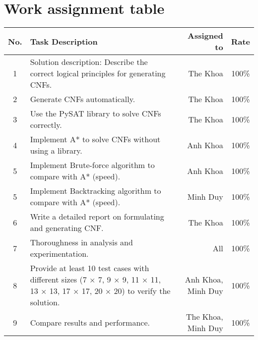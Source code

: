 \section{Work assignment table}
\begin{center}
  \renewcommand{\arraystretch}{1.5}
  \begin{tabular}{|c|p{}|r|c|}
    \hline
    \textbf{No.} & \textbf{Task Description}                                                                                                      & \textbf{Assigned to} & \textbf{Rate} \\\hline
    1            & Solution description: Describe the correct logical principles for generating CNFs.                                             & The Khoa             & 100\%         \\\hline
    2            & Generate CNFs automatically.                                                                                                   & The Khoa             & 100\%         \\\hline
    3            & Use the PySAT library to solve CNFs correctly.                                                                                 & The Khoa             & 100\%         \\\hline
    4            & Implement A* to solve CNFs without using a library.                                                                            & Anh Khoa             & 100\%         \\\hline
    5            & Implement Brute-force algorithm to compare with A* (speed).                                                                    & Anh Khoa             & 100\%         \\\hline
    5            & Implement Backtracking algorithm to compare with A* (speed).                                                                   & Minh Duy             & 100\%         \\\hline
    6            & Write a detailed report on formulating and generating CNF\@.                                                                   & The Khoa             & 100\%         \\\hline
    7            & Thoroughness in analysis and experimentation.                                                                                  & All                  & 100\%         \\\hline
    8            & Provide at least 10 test cases with different sizes (7 × 7, 9 × 9, 11 × 11, 13 × 13, 17 × 17, 20 × 20) to verify the solution. & Anh Khoa, Minh Duy   & 100\%         \\\hline
    9            & Compare results and performance.                                                                                               & The Khoa, Minh Duy   & 100\%         \\\hline
  \end{tabular}
\end{center}
